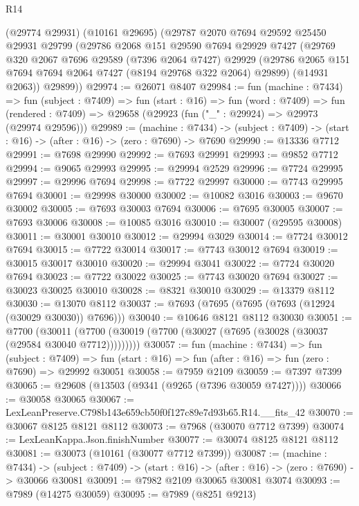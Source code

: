 \begin{lexlean}{R14}
\begin{coremodule}
    (@29774 @29931)
    (@10161 @29695)
    (@29787
      @2070
      @7694
      @29592
      @25450
      @29931
      @29799
      (@29786
        @2068
        @151
        @29590
        @7694
        @29929
        @7427
        (@29769
          @320
          @2067
          @7696
          @29589
          (@7396 @2064 @7427)
          @29929
          (@29786 @2065 @151 @7694 @7694 @2064 @7427 (@8194 @29768 @322 @2064) @29899)
          (@14931 @2063))
        @29899))
@29974 := @26071 @8407
@29984 := fun (machine : @7434) =>
  fun (subject : @7409) =>
  fun (start : @16) =>
  fun (word : @7409) =>
  fun (rendered : @7409) => @29658 (@29923 (fun ("_" : @29924) => @29973 (@29974 @29596)))
@29989 := (machine : @7434) ->
  (subject : @7409) -> (start : @16) -> (after : @16) -> (zero : @7690) -> @7690
@29990 := @13336 @7712
@29991 := @7698 @29990
@29992 := @7693 @29991
@29993 := @9852 @7712
@29994 := @9065 @29993
@29995 := @29994 @2529
@29996 := @7724 @29995
@29997 := @29996 @7694
@29998 := @7722 @29997
@30000 := @7743 @29995 @7694
@30001 := @29998 @30000
@30002 := @10082 @3016
@30003 := @9670 @30002
@30005 := @7693 @30003 @7694
@30006 := @7695 @30005
@30007 := @7693 @30006
@30008 := @10085 @3016
@30010 := @30007 (@29595 @30008)
@30011 := @30001 @30010
@30012 := @29994 @3029
@30014 := @7724 @30012 @7694
@30015 := @7722 @30014
@30017 := @7743 @30012 @7694
@30019 := @30015 @30017 @30010
@30020 := @29994 @3041
@30022 := @7724 @30020 @7694
@30023 := @7722 @30022
@30025 := @7743 @30020 @7694
@30027 := @30023 @30025 @30010
@30028 := @8321 @30010
@30029 := @13379 @8112
@30030 := @13070 @8112
@30037 := @7693 (@7695 (@7695 (@7693 (@12924 (@30029 @30030)) @7696)))
@30040 := @10646 @8121 @8112 @30030
@30051 := @7700
    (@30011 (@7700 (@30019 (@7700 (@30027 (@7695 (@30028 (@30037 (@29584 @30040 @7712)))))))))
@30057 := fun (machine : @7434) =>
  fun (subject : @7409) =>
  fun (start : @16) => fun (after : @16) => fun (zero : @7690) => @29992 @30051
@30058 := @7959 @2109
@30059 := @7397 @7399
@30065 := @29608 (@13503 (@9341 (@9265 (@7396 @30059 @7427))))
@30066 := @30058 @30065
@30067 := LexLeanPreserve.C798b143e659cb50f0f127c89e7d93b65.R14.__fits_42
@30070 := @30067 @8125 @8121 @8112
@30073 := @7968 (@30070 @7712 @7399)
@30074 := LexLeanKappa.Json.finishNumber
@30077 := @30074 @8125 @8121 @8112
@30081 := @30073 (@10161 (@30077 @7712 @7399))
@30087 := (machine : @7434) ->
  (subject : @7409) -> (start : @16) -> (after : @16) -> (zero : @7690) -> @30066 @30081
@30091 := @7982 @2109 @30065 @30081 @3074
@30093 := @7989 (@14275 @30059)
@30095 := @7989 (@8251 @9213)

\end{coremodule}
\end{lexlean}
